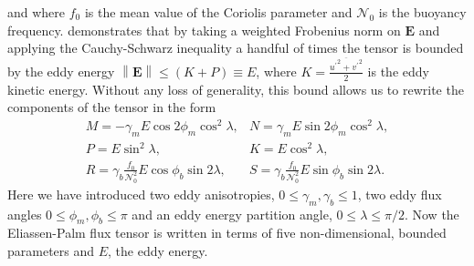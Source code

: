 \documentclass[10pt,a4paper]{article}
\newcommand*\mean[1]{\overline{#1}}
\newcommand*\res[1]{{#1}^{\prime}}
\begin{document}
                 and where $f_{0}$ is the mean value of the Coriolis parameter and $\mathcal{N}_{0}$ is the buoyancy frequency. \cite{marshall2012framework}
                demonstrates that by taking a weighted Frobenius norm on $\boldsymbol{E} $
                and applying the Cauchy-Schwarz inequality a handful of times the 
                 tensor is bounded by the eddy energy ${\left\|\boldsymbol{E}\right\|\leq\left(K+P\right)\equiv E}$,
                 where $K=\frac{\mean{{\res{u}}^{2} + {\res{v}}^{2}}}{2}$ is the eddy
                 kinetic energy.
                 Without any loss of generality, this bound allows us to rewrite the components of the tensor in the form
                 \begin{equation}
                 \begin{array}{cc}
                 M = -\gamma_{m}E\cos{2\phi_{m}}\cos^{2}{\lambda}, & 
                 N = \gamma_{m}E\sin{2\phi_{m}}\cos^{2}{\lambda}, \\
                 P =  E\sin^{2}{\lambda}, &  K =  E\cos^{2}{\lambda},  \\
                 R =  \gamma_{b}\frac{f_{0}}{\mathcal{N}_{0}^{2}}E\cos{\phi_{b}}\sin{2\lambda}, &
                 S = \gamma_{b}\frac{f_{0}}{\mathcal{N}_{0}^{2}}E\sin{\phi_{b}}\sin{2\lambda} .
                 \end{array} 
                 \end{equation}
                 Here we have introduced two eddy anisotropies, $0\leq\gamma_{m},\gamma_{b}\leq1$, two eddy flux angles $0\leq\phi_{m},\phi_{b}\leq\pi$ and an eddy energy partition angle,
                 $0\leq\lambda\leq\pi/2$. Now the Eliassen-Palm flux tensor
                 is written in terms of five non-dimensional, bounded parameters
                 and $E$, the eddy energy.
                 
\end{document}
